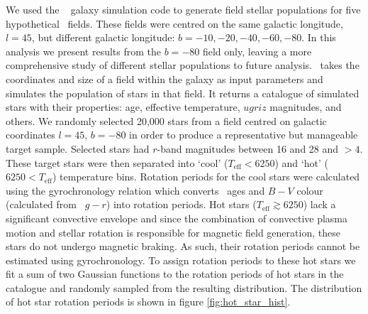 We used the \TRILEGAL\ \citep{Girardi2012} galaxy simulation code to generate
field stellar populations for five hypothetical \LSST\ fields.
These fields were centred on the same galactic longitude, $l=45$, but
different galactic longitude: $b=-10,-20,-40,-60,-80$.
In this analysis we present results from the $b=-80$ field only, leaving a
more comprehensive study of different stellar populations to future analysis.
\TRILEGAL\ takes the coordinates and size of a field within the galaxy as
input parameters and simulates the population of stars in that field.
It returns a catalogue of simulated stars with their properties: age,
effective temperature, $ugriz$ magnitudes, and others.
We randomly selected 20,000 stars from a field centred on galactic coordinates
$l=45$, $b=-80$ in order to produce a representative but manageable target
sample.
Selected stars had $r$-band magnitudes between 16 and 28 and \logg $>4$.
These target stars were then separated into `cool' ($T_{\mathrm{eff}}< 6250$)
and `hot' ($6250 < T_{\mathrm{eff}}$) temperature bins.
Rotation periods for the cool stars were calculated using the
\citet{Angus2015} gyrochronology relation which converts \TRILEGAL\ ages and
$B-V$ colour (calculated from \TRILEGAL\ $g-r$) into rotation periods.
Hot stars ($T_{\mathrm{eff}}\gtrsim 6250$) lack a significant convective
envelope and since the combination of convective plasma motion and stellar
rotation is responsible for magnetic field generation, these stars do not
undergo magnetic braking.
As such, their rotation periods cannot be estimated using gyrochronology.
To assign rotation periods to these hot stars we fit a sum of two Gaussian
functions to the rotation periods of hot stars in the \citet{Mcquillan2014}
catalogue and randomly sampled from the resulting distribution.
The distribution of hot star rotation periods is shown in figure
\ref{fig:hot_star_hist}.

